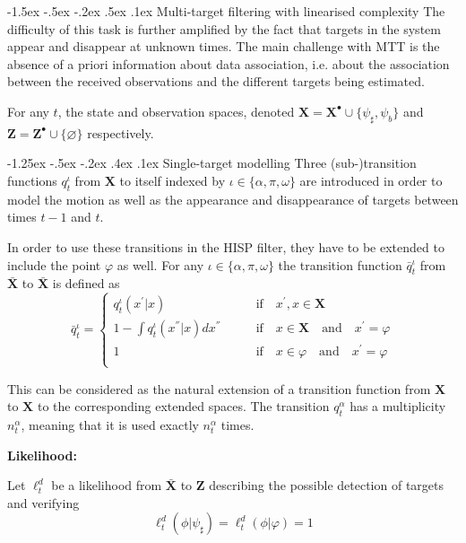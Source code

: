 \documentclass[a4paper, 11pt]{article}
\makeatletter
\newcommand{\sihao}{\fontsize{14pt}{\baselineskip}\selectfont}
\newcommand{\xiaosihao}{\fontsize{12pt}{\baselineskip}\selectfont}
\renewcommand\section{\@startsection{section}{1}{\z@}%
{-1.5ex \@plus -.5ex \@minus -.2ex}%
{.5ex \@plus .1ex}%
{\normalfont\sihao\CJKfamily{hei}}}
\renewcommand\subsection{\@startsection{subsection}{1}{\z@}%
{-1.25ex \@plus -.5ex \@minus -.2ex}%
{.4ex \@plus .1ex}%
{\normalfont\xiaosihao\CJKfamily{hei}}}
\makeatother
\begin{document}
\begin{CJK}{UTF8}{gbsn}
\section{Multi-target filtering with linearised complexity}
The difficulty of this task is further amplified by the fact that targets in the system appear and disappear at unknown times.
The main challenge with MTT is the absence of a priori information about data association, i.e. about the association between the received observations and the different targets being estimated.

For any $t$, the state and observation spaces, denoted $\mathbf{X} = \mathbf{X}^{\bullet} \cup \{ \psi_{\sharp}, \psi_b \}$ and $\mathbf{Z} = \mathbf{Z}^{\bullet} \cup \{ \varnothing \}$ respectively.

\subsection{Single-target modelling}
Three (sub-)transition functions $q_t^{\iota}$ from $\mathbf{X}$ to itself indexed by $\iota \in \{\alpha,\pi,\omega \}$ are introduced in order to model the motion as well as the appearance and disappearance of targets between times $t-1$ and $t$.


In order to use these transitions in the HISP filter, they have to be extended to include the point $\varphi$ as well. For any $\iota \in \{\alpha,\pi,\omega \}$ the transition function $\bar{q}_t^{\iota}$ from $\bar{\mathbf{X}}$ to $\bar{\mathbf{X}}$ is defined as
\begin{equation}
\bar{q}_t^{\iota} =  \left\{
\begin{aligned}
 q_t^{\iota}(x^{'}|x) & \qquad \text{if} \quad  x^{'},x \in \mathbf{X} \\
 1 - \int  q_t^{\iota}(x^{''}|x) d x^{''} & \qquad \text{if} \quad x \in \mathbf{X} \quad \text{and}  \quad x^{'} = \varphi\\
 1 & \qquad \text{if} \quad x \in \varphi \quad \text{and}  \quad x^{'} = \varphi\\
\end{aligned}
\right.
\end{equation}

This can be considered as the natural extension of a transition function from $\mathbf{X}$ to $\mathbf{X}$ to the corresponding extended spaces. The transition $q_t^{\alpha}$ has a multiplicity $n_t^{\alpha}$, meaning that it is used exactly $n_t^{\alpha}$ times.

\textbf{Likelihood:}

Let $\ell_t^d$ be a likelihood from $\bar{\mathbf{X}}$ to $\mathbf{Z}$ describing the possible detection of targets and verifying
\begin{equation}
\ell_t^d(\phi | \psi_{\sharp}) = \ell_t^d(\phi | \varphi) = 1
\end{equation}

\end{CJK}
\end{document}
